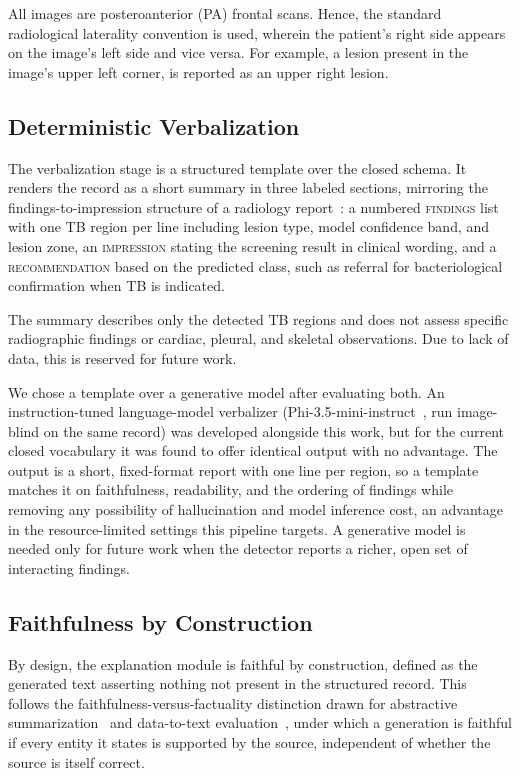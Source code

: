 \documentclass[conference, letterpaper]{IEEEtran}
\begin{document}
All images are posteroanterior (PA) frontal scans. Hence, the standard radiological laterality convention is used, wherein the patient's right side appears on the image's left side and vice versa. For example, a lesion present in the image's upper left corner, is reported as an upper right lesion.

\subsection{Deterministic Verbalization}

The verbalization stage is a structured template over the closed schema. It renders the record as a short summary in three labeled sections, mirroring the findings-to-impression structure of a radiology report~\cite{zhang2024llm_impressions}: a numbered \textsc{findings} list with one TB region per line including lesion type, model confidence band, and lesion zone, an \textsc{impression} stating the screening result in clinical wording, and a \textsc{recommendation} based on the predicted class, such as referral for bacteriological confirmation when TB is indicated.

The summary describes only the detected TB regions and does not assess specific radiographic findings or cardiac, pleural, and skeletal observations. Due to lack of data, this is reserved for future work.

We chose a template over a generative model after evaluating both. An instruction-tuned language-model verbalizer (Phi-3.5-mini-instruct~\cite{abdin2024phi3}, run image-blind on the same record) was developed alongside this work, but for the current closed vocabulary it was found to offer identical output with no advantage. The output is a short, fixed-format report with one line per region, so a template matches it on faithfulness, readability, and the ordering of findings while removing any possibility of hallucination and model inference cost, an advantage in the resource-limited settings this pipeline targets. A generative model is needed only for future work when the detector reports a richer, open set of interacting findings.

\subsection{Faithfulness by Construction}

By design, the explanation module is faithful by construction, defined as the generated text asserting nothing not present in the structured record. This follows the faithfulness-versus-factuality distinction drawn for abstractive summarization~\cite{maynez2020faithfulness} and data-to-text evaluation~\cite{dhingra2019parent}, under which a generation is faithful if every entity it states is supported by the source, independent of whether the source is itself correct.
\end{document}
